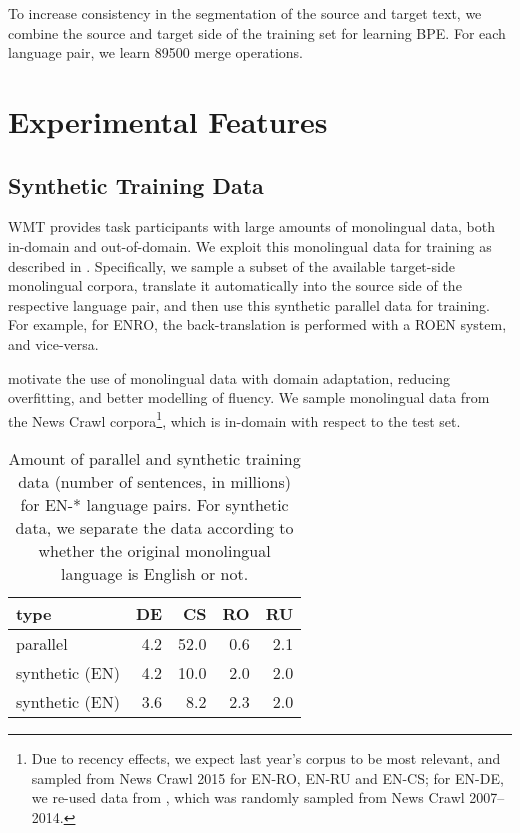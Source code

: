 \documentclass[11pt]{article}
\begin{document}
To increase consistency in the segmentation of the source and target text, we combine the source and target side of the training set for learning BPE.
For each language pair, we learn \num{89500} merge operations.

\section{Experimental Features}

\subsection{Synthetic Training Data}

WMT provides task participants with large amounts of monolingual data, both in-domain and out-of-domain.
We exploit this monolingual data for training as described in \cite{2015arXiv151106709S}.
Specifically, we sample a subset of the available target-side monolingual corpora, translate it automatically into the source side of the respective language pair,
and then use this synthetic parallel data for training.
For example, for ENRO, the back-translation is performed with a ROEN system, and vice-versa.

 motivate the use of monolingual data with domain adaptation, reducing overfitting, and better modelling of fluency.
We sample monolingual data from the News Crawl corpora\footnote{Due to recency effects, we expect last year's corpus to be most relevant, and sampled from News Crawl 2015 for EN-RO, EN-RU and EN-CS; for EN-DE, we re-used data from \cite{2015arXiv151106709S}, which was randomly sampled from News Crawl 2007--2014.}, which is in-domain with respect to the test set.

\begin{table}
\centering
\begin{tabular}{l|rrrr}
type & DE & CS & RO & RU\\
\hline
parallel & 4.2 & 52.0 & 0.6 & 2.1 \\
synthetic (EN) & 4.2 & 10.0 & 2.0 & 2.0\\
synthetic (EN) & 3.6 & 8.2 & 2.3 & 2.0\\
\end{tabular}
\caption{Amount of parallel and synthetic training data (number of sentences, in millions) for EN-* language pairs. 
For synthetic data, we separate the data according to whether the original monolingual language is English or not. 
}
\label{data}
\end{table}
\end{document}

